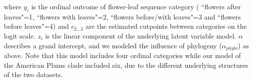 \documentclass{article}[12pt]
\begin{document}
{where $y_i$ is the ordinal outcome of flower-leaf sequence category ( ``flowers after leaves"=1, ``flowers with leaves"=2, ``flowers before/with leaves"=3 and ``flowers before leaves"=4) and $c_{2...3}$ are the estimated cutpoints between categories on the logit scale. $z_i$ is the linear component of the underlying latent variable model. $\alpha$ describes a grand intercept, and we modeled the influence of phylogeny ($\alpha_{phylo}$) as above. Note that this model includes four ordinal categories while our model of the American Plums clade included six, due to the different underlying structures of the two datasets.
%
%
%
%
%
%  
  
}
\end{document}
